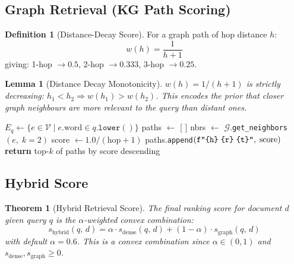 \documentclass[12pt, a4paper]{article}
\theoremstyle{definition}
\newtheorem{definition}{Definition}[section]
\theoremstyle{plain}
\newtheorem{theorem}{Theorem}[section]
\newtheorem{lemma}{Lemma}[section]
\theoremstyle{remark}
\begin{document}
\subsection{Graph Retrieval (KG Path Scoring)}

\begin{definition}[Distance-Decay Score]
For a graph path of hop distance $h$:
\[
  w(h) = \frac{1}{h+1}
\]
giving: 1-hop $\to 0.5$, 2-hop $\to 0.333$, 3-hop $\to 0.25$.
\end{definition}

\begin{lemma}[Distance Decay Monotonicity]
$w(h) = 1/(h+1)$ is strictly decreasing: $h_1 < h_2 \Rightarrow w(h_1) > w(h_2)$.
This encodes the prior that closer graph neighbours are more relevant to
the query than distant ones.
\end{lemma}

\begin{algorithm}[H]
\caption{Graph Path Retrieval --- Algorithm 4}
\label{alg:graph}
\begin{algorithmic}[1]
  \State $E_q \gets \{e \in \mathcal{V} \mid e.\text{word} \in q.\texttt{lower}()\}$
  \State paths $\gets$ [ ]
    \State nbrs $\gets$ $\mathcal{G}$.\texttt{get\_neighbors}$(e,\;k=2)$
      \State score $\gets 1.0 / (\text{hop}+1)$
      \State paths.\texttt{append}$(\texttt{f"\{h\}\;\{r\}\;\{t\}"},\;\text{score})$
    \EndFor
  \EndFor
  \State \textbf{return} top-$k$ of paths by score descending
\EndProcedure
\end{algorithmic}
\end{algorithm}

\subsection{Hybrid Score}

\begin{theorem}[Hybrid Retrieval Score]
\label{thm:hybrid}
The final ranking score for document $d$ given query $q$ is the
$\alpha$-weighted convex combination:
\[
  \boxed{
    s_{\mathrm{hybrid}}(q,\,d) =
    \alpha\cdot s_{\mathrm{dense}}(q,\,d)
    + (1-\alpha)\cdot s_{\mathrm{graph}}(q,\,d)
  }
\]
with default $\alpha = 0.6$.  This is a convex combination since
$\alpha \in (0,1)$ and $s_{\mathrm{dense}}, s_{\mathrm{graph}} \geq 0$.
\end{theorem}
\end{document}
